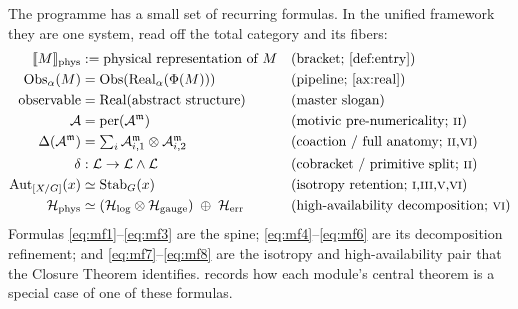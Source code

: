 \documentclass[12pt]{article}
\theoremstyle{definition}
\theoremstyle{remark}
\newcommand{\Real}{\mathrm{Real}}
\newcommand{\Obs}{\mathrm{Obs}}
\newcommand{\Aut}{\operatorname{Aut}}
\newcommand{\Stab}{\operatorname{Stab}}
\newcommand{\per}{\mathrm{per}}
\newcommand{\physrep}[1]{\llbracket #1 \rrbracket_{\mathrm{phys}}}
\newcommand{\Ho}{\mathcal{H}}
\newcommand{\Hphys}{\Ho_{\mathrm{phys}}}
\newcommand{\Hlog}{\Ho_{\mathrm{log}}}
\newcommand{\Hgauge}{\Ho_{\mathrm{gauge}}}
\newcommand{\Herr}{\Ho_{\mathrm{err}}}
\newcommand{\Amp}{\mathcal{A}}
\newcommand{\Ampm}{\mathcal{A}^{\mathfrak{m}}}
\newcommand{\Lcoalg}{\mathcal{L}}
\newcommand{\PI}{\textsc{i}}
\newcommand{\PII}{\textsc{ii}}
\newcommand{\PIII}{\textsc{iii}}
\newcommand{\PV}{\textsc{v}}
\newcommand{\PVI}{\textsc{vi}}
\begin{document}
The programme has a small set of recurring formulas.  In the unified framework they are
one system, read off the total category and its fibers:
\begin{align}
\physrep{M} &:= \text{physical representation of }M
   && \text{(bracket; \Cref{def:entry})} \label{eq:mf1}\\
\Obs_\alpha(M) &= \Obs(\Real_\alpha(\Phi(M)))
   && \text{(pipeline; \Cref{ax:real})} \label{eq:mf2}\\
\text{observable} &= \Real(\text{abstract structure})
   && \text{(master slogan)} \label{eq:mf3}\\
\Amp &= \per(\Ampm)
   && \text{(motivic pre-numericality; \PII)} \label{eq:mf4}\\
\Delta(\Ampm) &= \textstyle\sum_i \Ampm_{i,1}\otimes\Ampm_{i,2}
   && \text{(coaction / full anatomy; \PII,\PVI)} \label{eq:mf5}\\
\delta &: \Lcoalg\to\Lcoalg\wedge\Lcoalg
   && \text{(cobracket / primitive split; \PII)} \label{eq:mf6}\\
\Aut_{[X/G]}(x) &\simeq \Stab_G(x)
   && \text{(isotropy retention; \PI,\PIII,\PV,\PVI)} \label{eq:mf7}\\
\Hphys &\simeq (\Hlog\otimes\Hgauge)\;\oplus\;\Herr
   && \text{(high-availability decomposition; \PVI)} \label{eq:mf8}
\end{align}
Formulas \eqref{eq:mf1}--\eqref{eq:mf3} are the spine; \eqref{eq:mf4}--\eqref{eq:mf6}
are its decomposition refinement; and \eqref{eq:mf7}--\eqref{eq:mf8} are the isotropy
and high-availability pair that the Closure Theorem identifies.  
records how each module's central theorem is a special case of one of these formulas.
\end{document}
